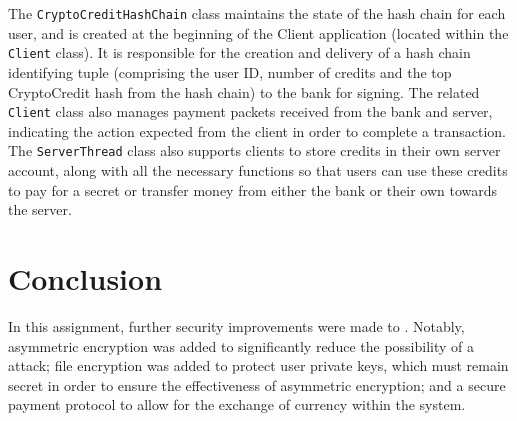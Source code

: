 \documentclass[a4paper,11pt]{article}
\begin{document}
The \verb+CryptoCreditHashChain+ class maintains the state of the hash chain for
each user, and is created at the beginning of the Client application (located 
within the \verb+Client+ class). It is responsible for the creation and delivery
of a hash chain identifying tuple (comprising the user ID, number of credits and
the top CryptoCredit hash from the hash chain) to the bank for signing. The 
related \verb+Client+ class also manages payment packets received from the bank 
and server, indicating the action expected from the client in order to complete 
a transaction. The \verb+ServerThread+ class also supports clients to store 
credits in their own server account, along with all the necessary functions so 
that users can use these credits to pay for a secret or transfer money from 
either the bank or their own towards the server.

\section{Conclusion}
In this assignment, further security improvements were made to \packageName{}.
Notably, asymmetric encryption was added to significantly reduce the possibility
of a  attack; file encryption was added to 
protect user private keys, which must remain secret in order to ensure the 
effectiveness of asymmetric encryption; and a secure payment protocol to allow 
for the exchange of currency within the system.
\end{document}
